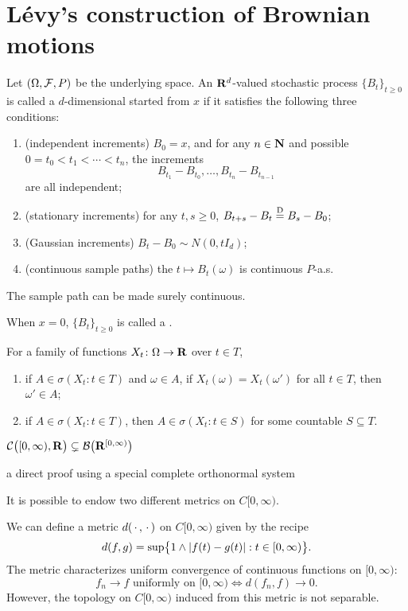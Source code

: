\documentclass[10pt]{book}
\begin{document}
\section{Lévy's construction of Brownian motions}

Let $(\Omega,\mathcal{F},P)$ be the underlying space. An $\mathbf{R}^d$-valued stochastic process $\{B_t\}_{t \geq 0}$ is called a $d$-dimensional  started from $x$ if it satisfies the following three conditions: \begin{enumerate}
    \item (independent increments) $B_0 = x$, and for any $n \in \mathbf{N}$ and possible $0 = t_0 < t_1 < \dotsb < t_n$, the increments \[
        B_{t_1} - B_{t_0}, \dotsc , B_{t_n} - B_{t_{n-1}} \] are all independent;
    \item (stationary increments) for any $t, s \geq 0$, $B_{t+s} - B_t \stackrel{\mathrm{D}}{=} B_s - B_0$;
    \item (Gaussian increments) $B_t - B_0 \sim N(0,tI_d)$;
    \item (continuous sample paths) the $t \mapsto B_t(\omega)$ is continuous $P$-a.s.
\end{enumerate}

The sample path can be made surely continuous.

When $x = 0$, $\{B_t\}_{t \geq 0}$ is called a .

\begin{thm}
    For a family of functions $X_t\colon \Omega \to \mathbf{R}$ over $t\in T$, \begin{enumerate}
        \item if $A \in \sigma(X_t:t\in T)$ and $\omega \in A$, if $X_t(\omega ) = X_t(\omega')$ for all $t \in T$, then $\omega ' \in A$;
        \item if $A \in \sigma(X_t:t\in T)$, then $A \in \sigma(X_t:t \in S)$ for some countable $S \subseteq T$.
    \end{enumerate}
\end{thm}

$\mathcal C\bigl([0,\infty),\mathbf{R}\bigr) \subsetneq \mathcal{B}\bigl(\mathbf{R}^{[0,\infty)}\bigr)$

a direct proof using a special complete orthonormal system

It is possible to endow two different metrics on $C[0,\infty)$.

\begin{prop}
    We can define a metric $d(\,\cdot\,,\,\cdot\,)$ on $C[0,\infty)$ given by the recipe 
    \[d(f,g) = \sup\bigl\{1 \land \lvert f(t) - g(t) \rvert : t \in [0,\infty)\bigr\}.\] The metric characterizes uniform convergence of continuous functions on $[0,\infty)$: \[
        f_n \to f \text{ uniformly on }[0,\infty) \iff d(f_n, f) \to 0.
    \] However, the topology on $C[0,\infty)$ induced from this metric is not separable.
\end{prop}
\end{document}
